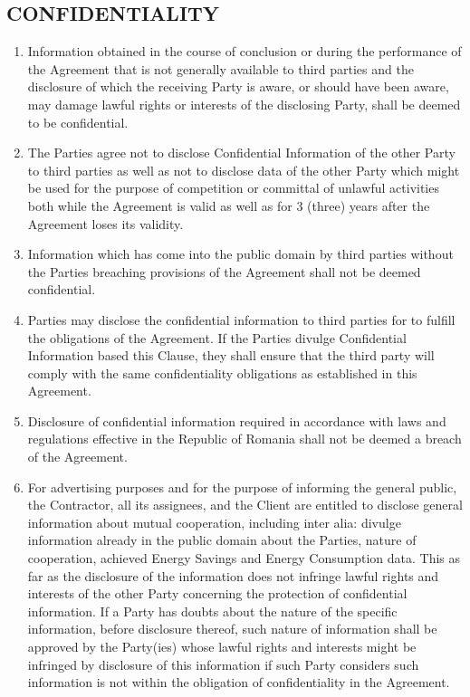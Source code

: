 \begin{multicols}{2}
\subsection{CONFIDENTIALITY}
\begin{enumerate}
	\item	Information obtained in the course of conclusion or during the performance of the Agreement that is not generally available to third parties and the disclosure of which the receiving Party is aware, or should have been aware, may damage lawful rights or interests of the disclosing Party, shall be deemed to be confidential.
	\item	The Parties agree not to disclose Confidential Information of the other Party to third parties as well as not to disclose data of the other Party which might be used for the purpose of competition or committal of unlawful activities both while the Agreement is valid as well as for 3 (three) years after the Agreement loses its validity.
	\item	Information which has come into the public domain by third parties without the Parties breaching provisions of the Agreement shall not be deemed confidential.
	\item	Parties may disclose the confidential information to third parties for to fulfill the obligations of the Agreement. If the Parties divulge Confidential Information based this Clause, they shall ensure that the third party will comply with the same confidentiality obligations as established in this Agreement.
	\item	Disclosure of confidential information required in accordance with laws and regulations effective in the Republic of Romania shall not be deemed a breach of the Agreement.
	\item	For advertising purposes and for the purpose of informing the general public, the Contractor, all its assignees, and the Client are entitled to disclose general information about mutual cooperation, including inter alia: divulge information already in the public domain about the Parties, nature of cooperation, achieved Energy Savings and Energy Consumption data. This as far as the disclosure of the information does not infringe lawful rights and interests of the other Party concerning the protection of confidential information. If a Party has doubts about the nature of the specific information, before disclosure thereof, such nature of information shall be approved by the Party(ies) whose lawful rights and interests might be infringed by disclosure of this information if such Party considers such information is not within the obligation of confidentiality in the Agreement. %

\end{enumerate}
\end{multicols}
